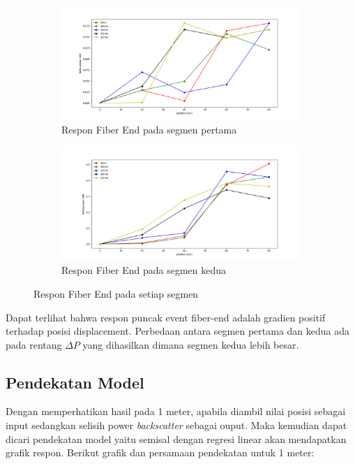 \documentclass[12pt]{article}
\begin{document}
	\begin{figure}[!h]
		\centering
		\captionsetup{justification=centering}
		\begin{subfigure}[h]{0.9\textwidth}
			\includegraphics[width=\textwidth]{images/Bab_4/fiber_A_end}	
			\caption{\small{Respon Fiber End pada segmen pertama}}		
		\end{subfigure}
		\begin{subfigure}[h]{0.9\textwidth}
			\includegraphics[width=\linewidth]{images/Bab_4/fiber_B_end}
			\caption{\small{Respon Fiber End pada segmen kedua}}			
		\end{subfigure}
		\caption[belum ada judul]{\small{Respon Fiber End pada setiap segmen}}
	\end{figure}

	Dapat terlihat bahwa respon puncak event fiber-end adalah gradien positif terhadap posisi displacement.
	Perbedaan antara segmen pertama dan kedua ada pada rentang $\Delta P$ yang dihasilkan dimana segmen kedua lebih besar.

\newpage
	\subsection{Pendekatan Model}
	
	Dengan memperhatikan hasil pada 1 meter, apabila diambil nilai posisi sebagai input sedangkan selisih power \textit{backscatter} sebagai ouput.
	Maka kemudian dapat dicari pendekatan model yaitu semisal dengan regresi linear akan mendapatkan grafik respon.
	Berikut grafik dan persamaan pendekatan untuk 1 meter:
	
\end{document}
